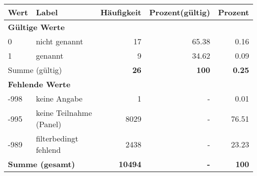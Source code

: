      \begin{longtable}{lXrrr}
     \toprule
     \textbf{Wert} & \textbf{Label} & \textbf{Häufigkeit} & \textbf{Prozent(gültig)} & \textbf{Prozent} \\
     \endhead
     \midrule
     \multicolumn{5}{l}{\textbf{Gültige Werte}}\\

     0 &
     \multicolumn{1}{X}{ nicht genannt   } &


       \num{17} &
       \num[round-mode=places,round-precision=2]{65,38} &
         \num[round-mode=places,round-precision=2]{0,16} \\

     1 &
     \multicolumn{1}{X}{ genannt   } &


       \num{9} &
       \num[round-mode=places,round-precision=2]{34,62} &
         \num[round-mode=places,round-precision=2]{0,09} \\
     \midrule
     \multicolumn{2}{l}{Summe (gültig)} &
       \textbf{\num{26}} &
     \textbf{100} &
       \textbf{\num[round-mode=places,round-precision=2]{0,25}} \\
     \multicolumn{5}{l}{\textbf{Fehlende Werte}}\\
       -998 &
       keine Angabe &
         \num{1} &
        - &
         \num[round-mode=places,round-precision=2]{0,01} \\
       -995 &
       keine Teilnahme (Panel) &
         \num{8029} &
        - &
         \num[round-mode=places,round-precision=2]{76,51} \\
       -989 &
       filterbedingt fehlend &
         \num{2438} &
        - &
         \num[round-mode=places,round-precision=2]{23,23} \\
     \midrule
     \multicolumn{2}{l}{\textbf{Summe (gesamt)}} &
          \textbf{\num{10494}} &
        \textbf{-} &
        \textbf{100} \\
     \bottomrule
     \end{longtable}
     
